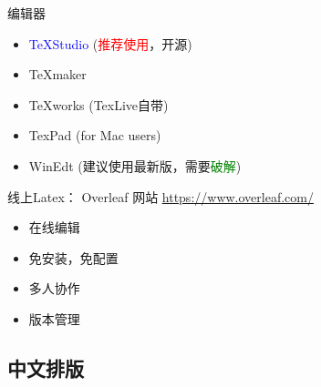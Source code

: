 \documentclass[13pt]{ctexbeamer}
\newcommand{\red}[1]{\textcolor{red}{#1}}
\newcommand{\blue}[1]{\textcolor{blue}{#1}}
\newcommand{\green}[1]{\textcolor{green}{#1}}
\begin{document}
\begin{frame}{编辑器}
\begin{itemize}
\item  \blue{TeXStudio} (\red{推荐使用}，开源)
\item TeXmaker
\item TeXworks (TexLive自带)
\item TexPad (for Mac users)
\item WinEdt (建议使用最新版，需要\green{破解})
\end{itemize}
\end{frame}






\begin{frame}{线上Latex：  Overleaf}
网站
\href{https://www.overleaf.com?r=4c8832b9&rm=d&rs=b
}{https://www.overleaf.com/
}


\begin{itemize}
\item 在线编辑

\item 免安装，免配置

\item 多人协作

\item 版本管理
\end{itemize}
\end{frame}



\subsection{中文排版}

%
%
%
\end{document}
